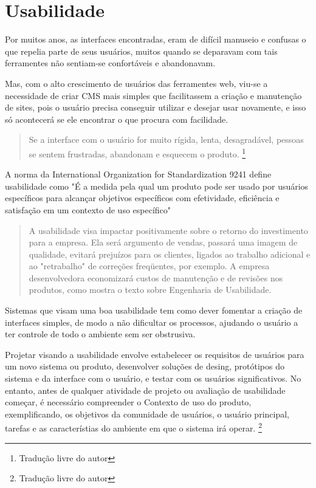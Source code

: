 \chapter{Usabilidade}

Por muitos anos, as interfaces encontradas, eram de difícil manuseio e confusas o que repelia parte de seus usuários, muitos quando se deparavam com tais ferramentes não sentiam-se confortáveis e abandonavam.

Mas, com o alto crescimento de usuários das ferramentes web, viu-se a necessidade de criar CMS mais simples que facilitassem a criação e manutenção de sites, pois o usuário precisa conseguir utilizar e desejar usar novamente, e isso só acontecerá se ele encontrar o que procura com facilidade.

\begin{quote} 
Se a interface com o usuário for muito rígida, lenta, desagradável, pessoas se sentem frustradas, abandonam e esquecem o produto.
\cite{usability_evaluation_learning}\footnote{Tradução livre do autor}
\end{quote}

A norma da International Organization for Standardization 9241 define usabilidade como "É a medida pela qual um produto pode ser usado por usuários específicos para alcançar objetivos específicos com efetividade, eficiência e satisfação em um contexto de uso específico"

\begin{quote}
A usabilidade visa impactar positivamente sobre o retorno do investimento para a empresa. Ela será argumento de vendas, passará uma imagem de qualidade, evitará prejuízos para os clientes, ligados ao trabalho adicional e ao "retrabalho" de correções freqüentes, por exemplo. A empresa desenvolvedora economizará custos de manutenção e de revisões nos produtos, como mostra o texto sobre Engenharia de Usabilidade.
\cite{nielsen_usabilidade}
\end{quote}

Sistemas que visam uma boa usabilidade tem como dever fomentar a criação de interfaces simples, de modo a não dificultar os processos, ajudando o usuário a ter controle de todo o ambiente sem ser obstrusiva.

Projetar visando a usabilidade envolve estabelecer os requisitos de usuários para um novo sistema ou produto, desenvolver soluções de desing, protótipos do sistema e da interface com o usuário, e testar com os usuários significativos. No entanto, antes de qualquer atividade de projeto ou avaliação de usabilidade começar, é necessário compreender o Contexto de uso do produto, exemplificando, os objetivos da comunidade de usuários, o usuário principal, tarefas e as característias do ambiente em que o sistema irá operar.
\cite{maguire_context_of_use}\footnote{Tradução livre do autor}

